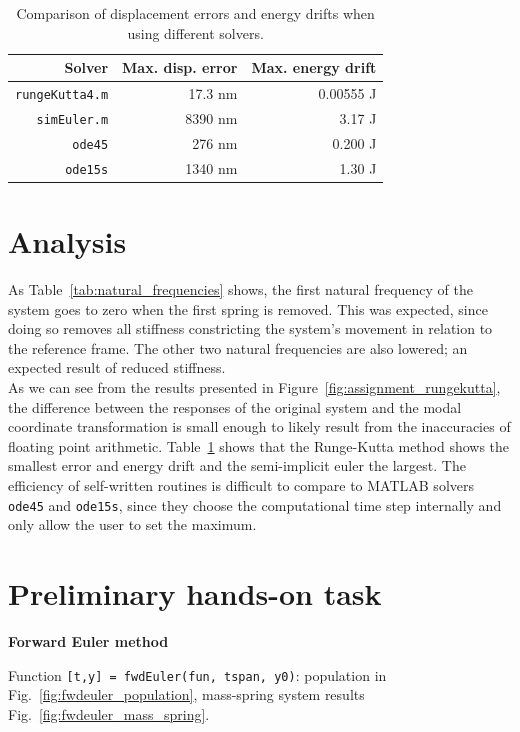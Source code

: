 \documentclass{article}
\begin{document}
	\begin{table}[h!]
	\centering
	\begin{tabular}{|r|r|r|}
		\hline
		Solver & Max. disp. error & Max. energy drift \\
		\hline
		\texttt{rungeKutta4.m} & 17.3 nm & 0.00555 J\\
		\texttt{simEuler.m} & 8390 nm & 3.17 J\\
		\texttt{ode45} & 276 nm & 0.200 J\\
		\texttt{ode15s} & 1340 nm & 1.30 J\\
		\hline
	\end{tabular}
	\caption{Comparison of displacement errors and energy drifts when using different solvers.}
	\label{tab:solver_comparison}
	\end{table}

	\section*{Analysis}
	As Table~\ref*{tab:natural_frequencies} shows, the first natural frequency of the system goes to zero when the first spring is removed. This was expected, since doing so removes all stiffness constricting the system's movement in relation to the reference frame. The other two natural frequencies are also lowered; an expected result of reduced stiffness.\\
	
	As we can see from the results presented in Figure~\ref*{fig:assignment_rungekutta}, the difference between the responses of the original system and the modal coordinate transformation is small enough to likely result from the inaccuracies of floating point arithmetic. Table~\ref*{tab:solver_comparison} shows that the Runge-Kutta method shows the smallest error and energy drift and the semi-implicit euler the largest. The efficiency of self-written routines is difficult to compare to MATLAB solvers \texttt{ode45} and \texttt{ode15s}, since they choose the computational time step internally and only allow the user to set the maximum.
	
	\clearpage
	\section*{Preliminary hands-on task}
	\vspace{-1ex}
	\textbf{Forward Euler method}
	
	Function \texttt{[t,y] = fwdEuler(fun, tspan, y0)}: population in Fig.~\ref*{fig:fwdeuler_population}, mass-spring system results Fig.~\ref*{fig:fwdeuler_mass_spring}.
	
\end{document}
